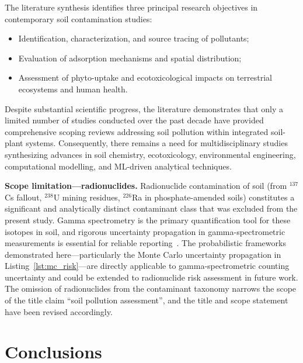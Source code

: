 \documentclass[environremediat,article,accept,pdftex,oneauthor]{Definitions/mdpi}
\begin{document}
{The literature synthesis identifies three principal research objectives in contemporary soil contamination studies: 
\begin{itemize}
    \item Identification, characterization, and source tracing
        of pollutants;
    \item Evaluation of adsorption mechanisms and spatial
        distribution;
    \item Assessment of phyto-uptake and ecotoxicological
        impacts on terrestrial ecosystems and human health.
\end{itemize}
}

Despite substantial scientific progress, the literature demonstrates that only a limited number of studies conducted over the past decade have provided comprehensive scoping reviews addressing soil pollution within integrated soil-plant systems. {Consequently, there remains a need for multidisciplinary studies synthesizing advances in soil chemistry, ecotoxicology, environmental engineering, computational modelling, and ML-driven analytical techniques.}

{\textbf{Scope limitation---radionuclides.} Radionuclide contamination of soil (from $^{137}$Cs fallout, $^{238}$U mining residues, $^{226}$Ra in phosphate-amended soils) constitutes a significant and analytically distinct contaminant class that was excluded from the present study. Gamma spectrometry is the primary quantification tool for these isotopes in soil, and rigorous uncertainty propagation in gamma-spectrometric measurements is essential for reliable reporting~\cite{Dragovi2005}. The probabilistic frameworks demonstrated here---particularly the Monte Carlo uncertainty propagation in Listing~\ref{lst:mc_risk}---are directly applicable to gamma-spectrometric counting uncertainty and could be extended to radionuclide risk assessment in future work. The omission of radionuclides from the contaminant taxonomy narrows the scope of the title claim ``soil pollution assessment'', and the title and scope statement have been revised accordingly.}

\section{Conclusions}\label{sec7}
\end{document}
